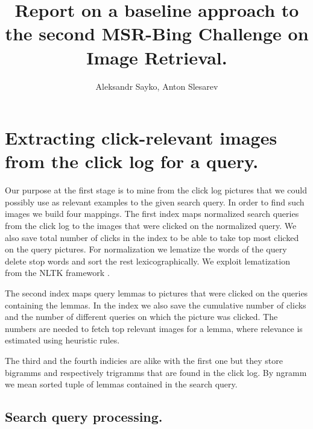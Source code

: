 \documentclass[11pt]{article} %
\title{Report on a baseline approach to the second MSR-Bing Challenge on Image Retrieval.}
\author{Aleksandr Sayko, Anton Slesarev}
\begin{document}
\maketitle


\section{Extracting click-relevant images from the  click log for a query.}

Our purpose at the first stage is to mine from the click log pictures that we could possibly use as relevant examples to the given search query. In order to find such images we build four mappings. The first index maps normalized search queries from the click log to the images that were clicked on the normalized query. We also save total number of clicks in the index to be able to take top most clicked on the query pictures. For normalization we lematize the words of the query delete stop words and sort the rest lexicographically. We exploit lematization from the NLTK framework \cite{NLTKSite}.

The second index maps query lemmas to pictures that were clicked on the queries containing the lemmas. In the index we also save the cumulative number of clicks and the number of different queries on which the picture was clicked. The numbers are needed to fetch top relevant images for a lemma, where relevance is estimated using heuristic rules.

The third and the fourth indicies are alike with the first one but they store bigramms and respectively trigramms that are found in the click log. By ngramm we mean sorted tuple of lemmas contained in the search query.

\subsection{Search query processing.}
\end{document}
